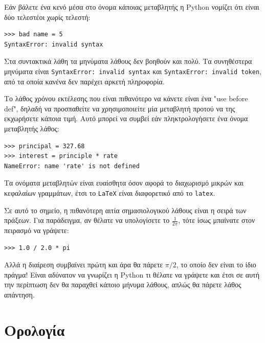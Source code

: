 \documentclass[10pt]{book}
\begin{document}
Εάν βάλετε ένα κενό μέσα στο όνομα κάποιας μεταβλητής η Python 
νομίζει ότι είναι δύο τελεστέοι χωρίς τελεστή:


\begin{verbatim}
>>> bad name = 5
SyntaxError: invalid syntax
\end{verbatim}
%

Στα συντακτικά λάθη τα μηνύματα λάθους δεν βοηθούν και πολύ.  
Τα συνηθέστερα μηνύματα είναι  {\tt SyntaxError: invalid syntax} 
και  {\tt SyntaxError: invalid token},  από τα οποία κανένα δεν
παρέχει αρκετή πληροφορία.

Το λάθος χρόνου εκτέλεσης που είναι πιθανότερο να κάνετε είναι
ένα "use before def", δηλαδή να προσπαθείτε να χρησιμοποιείτε
μία μεταβλητή προτού να της εκχωρήσετε κάποια τιμή.  Αυτό μπορεί να συμβεί
εάν πληκτρολογήσετε ένα όνομα μεταβλητής λάθος:


\begin{verbatim}
>>> principal = 327.68
>>> interest = principle * rate
NameError: name 'rate' is not defined
\end{verbatim}
%

Τα ονόματα μεταβλητών είναι ευαίσθητα όσον αφορά το διαχωρισμό
μικρών και κεφαλαίων γραμμάτων, έτσι το {\tt LaTeX} είναι
διαφορετικό από το {\tt latex}.


Σε αυτό το σημείο, η πιθανότερη αιτία σημασιολογικού λάθους
είναι η σειρά των πράξεων. Για παράδειγμα, αν θέλατε να υπολογίσετε το 
$\frac{1}{2 \pi}$, τότε ίσως μπαίνατε στον πειρασμό να γράψετε:

\begin{verbatim}
>>> 1.0 / 2.0 * pi
\end{verbatim}
%

Αλλά η διαίρεση συμβαίνει πρώτη και άρα θα πάρετε $\pi / 2$, το
οποίο δεν είναι το ίδιο πράγμα! Είναι αδύνατον να γνωρίζει η
Python τι θέλατε να γράψετε και έτσι σε αυτή την περίπτωση
δεν θα παραχθεί κάποιο μήνυμα λάθους, απλώς θα πάρετε λάθος απάντηση.


\section{Ορολογία}
\end{document}
